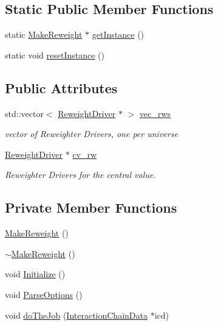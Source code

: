 \subsection*{Static Public Member Functions}
\begin{DoxyCompactItemize}
\item 
static \hyperlink{class_neutrino_flux_reweight_1_1_make_reweight}{Make\-Reweight} $\ast$ \hyperlink{class_neutrino_flux_reweight_1_1_make_reweight_a42d1fa92a1e30bd80538188e0c9d8b4a}{get\-Instance} ()
\item 
static void \hyperlink{class_neutrino_flux_reweight_1_1_make_reweight_a8c2f37dd6c735c721f3bc92f39fc45c9}{reset\-Instance} ()
\end{DoxyCompactItemize}
\subsection*{Public Attributes}
\begin{DoxyCompactItemize}
\item 
std\-::vector$<$ \hyperlink{class_neutrino_flux_reweight_1_1_reweight_driver}{Reweight\-Driver} $\ast$ $>$ \hyperlink{class_neutrino_flux_reweight_1_1_make_reweight_a5110b72da0e87323e3f38703a48e7f3f}{vec\-\_\-rws}
\begin{DoxyCompactList}\small\item\em vector of Reweighter Drivers, one per universe \end{DoxyCompactList}\item 
\hyperlink{class_neutrino_flux_reweight_1_1_reweight_driver}{Reweight\-Driver} $\ast$ \hyperlink{class_neutrino_flux_reweight_1_1_make_reweight_a35935c4e7b4d1822a1fb07a01e4edcb0}{cv\-\_\-rw}
\begin{DoxyCompactList}\small\item\em Reweighter Drivers for the central value. \end{DoxyCompactList}\end{DoxyCompactItemize}
\subsection*{Private Member Functions}
\begin{DoxyCompactItemize}
\item 
\hyperlink{class_neutrino_flux_reweight_1_1_make_reweight_a1b7214a269d05853a4c802b464ad61ab}{Make\-Reweight} ()
\item 
\hyperlink{class_neutrino_flux_reweight_1_1_make_reweight_a2be5c0c958fa2a2e5d80d1de43553f48}{$\sim$\-Make\-Reweight} ()
\item 
void \hyperlink{class_neutrino_flux_reweight_1_1_make_reweight_a98911718ad889b9f0f143ce4af66bc39}{Initialize} ()
\item 
void \hyperlink{class_neutrino_flux_reweight_1_1_make_reweight_a896fcdf132c8a81fe9dd961d9bb6dc61}{Parse\-Options} ()
\item 
void \hyperlink{class_neutrino_flux_reweight_1_1_make_reweight_a8ebedc9eed554ca5c5e5accae40341b7}{do\-The\-Job} (\hyperlink{class_neutrino_flux_reweight_1_1_interaction_chain_data}{Interaction\-Chain\-Data} $\ast$icd)
\end{DoxyCompactItemize}
